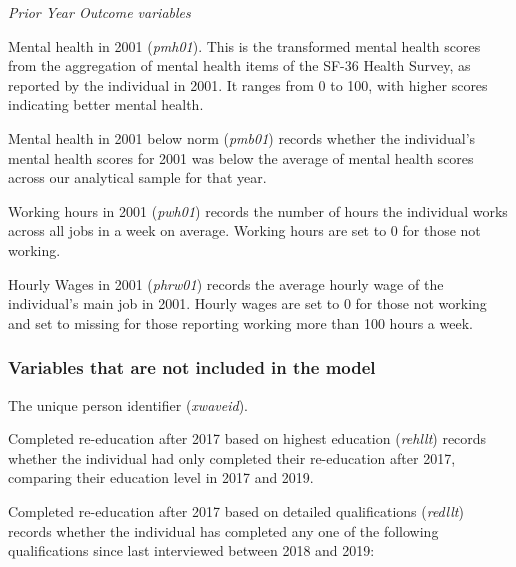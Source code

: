 \documentclass[12pt, a4paper]{article}
\begin{document}
\emph{Prior Year Outcome variables}

Mental health in 2001 (\textit{p\textunderscore{}mh01}). This is the transformed mental health scores from the aggregation of mental health items of the SF-36 Health Survey, as reported by the individual in 2001. It ranges from 0 to 100, with higher scores indicating better mental health.   

Mental health in 2001 below norm (\textit{p\textunderscore{}mb01}) records whether the individual’s mental health scores for 2001 was below the average of mental health scores across our analytical sample for that year. 

Working hours in 2001 (\textit{p\textunderscore{}wh01}) records the number of hours the individual works across all jobs in a week on average. Working hours are set to 0 for those not working.

Hourly Wages in 2001 (\textit{p\textunderscore{}hrw01}) records the average hourly wage of the individual’s main job in 2001. Hourly wages are set to 0 for those not working and set to missing for those reporting working more than 100 hours a week. 

\subsubsection{Variables that are not included in the model}

The unique person identifier (\textit{xwaveid}).

Completed re-education after 2017 based on highest education (\textit{rehllt}) records whether the individual had only completed their re-education after 2017, comparing their education level in 2017 and 2019.

Completed re-education after 2017 based on detailed qualifications (\textit{redllt}) records whether the individual has completed any one of the following qualifications since last interviewed between 2018 and 2019:
\end{document}
